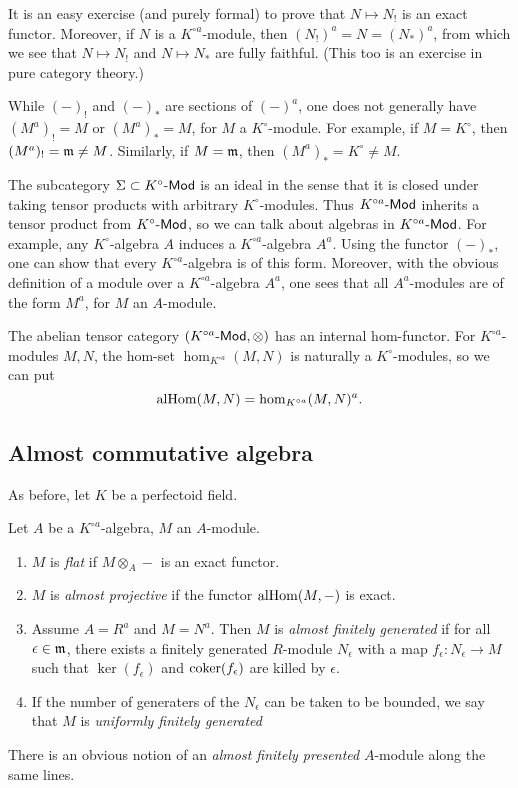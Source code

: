 It is an easy exercise (and purely formal) to prove that $N\mapsto N_!$ is an 
exact functor. Moreover, if $N$ is a $K^{\circ a}$-module, then 
$(N_!)^a = N = (N_\ast)^a$, from which we see that $N\mapsto N_!$ and 
$N\mapsto N_\ast$ are fully faithful. (This too is an exercise in pure category 
theory.) 

While $(-)_!$ and $(-)_\ast$ are sections of $(-)^a$, one does not generally 
have $(M^a)_!=M$ or $(M^a)_\ast=M$, for $M$ a $K^\circ$-module. For example, if 
$M=K^\circ$, then $(M^a)_! = \mathfrak{m}\ne M$. Similarly, if $M=\mathfrak{m}$, then 
$(M^a)_\ast = K^\circ\ne M$. 

The subcategory $\Sigma\subset K^\circ\textnormal{-}\mathsf{Mod}$ is an ideal in the sense that it is 
closed under taking tensor products with arbitrary $K^\circ$-modules. Thus 
$K^{\circ a}\textnormal{-}\mathsf{Mod}$ inherits a tensor product from $K^\circ\textnormal{-}\mathsf{Mod}$, so we can talk 
about algebras in $K^{\circ a}\textnormal{-}\mathsf{Mod}$. For example, any $K^\circ$-algebra $A$ 
induces a $K^{\circ a}$-algebra $A^a$. Using the functor $(-)_\ast$, one can 
show that every $K^{\circ a}$-algebra is of this form. Moreover, with the 
obvious definition of a module over a $K^{\circ a}$-algebra $A^a$, one sees that 
all $A^a$-modules are of the form $M^a$, for $M$ an $A$-module. 

The abelian tensor category $(K^{\circ a}\textnormal{-}\mathsf{Mod},\otimes)$ has an internal 
hom-functor. For $K^{\circ a}$-modules $M,N$, the hom-set 
$\hom_{K^{\circ a}}(M,N)$ is naturally a $K^\circ$-modules, so we can put 
\[
  \operatorname{alHom}(M,N) = \hom_{K^{\circ a}}(M,N)^a .
\]





\subsection{Almost commutative algebra}

As before, let $K$ be a perfectoid field. 

\begin{definition}
Let $A$ be a $K^{\circ a}$-algebra, $M$ an $A$-module. 
\begin{enumerate}
  \item $M$ is \emph{flat} if $M\otimes_A -$ is an exact functor. 
  \item $M$ is \emph{almost projective} if the functor $\operatorname{alHom}(M,-)$ is exact. 
  \item Assume $A=R^a$ and $M=N^a$. Then $M$ is \emph{almost finitely generated} 
    if for all $\epsilon\in \mathfrak{m}$, there exists a finitely generated 
    $R$-module $N_\epsilon$ with a map $f_\epsilon:N_\epsilon\to M$ such that 
    $\ker(f_\epsilon)$ and $\operatorname{coker}(f_\epsilon)$ are killed by $\epsilon$. 
  \item If the number of generaters of the $N_\epsilon$ can be taken to be 
    bounded, we say that $M$ is \emph{uniformly finitely generated}
\end{enumerate}
\end{definition}
There is an obvious notion of an \emph{almost finitely presented} $A$-module 
along the same lines. 

